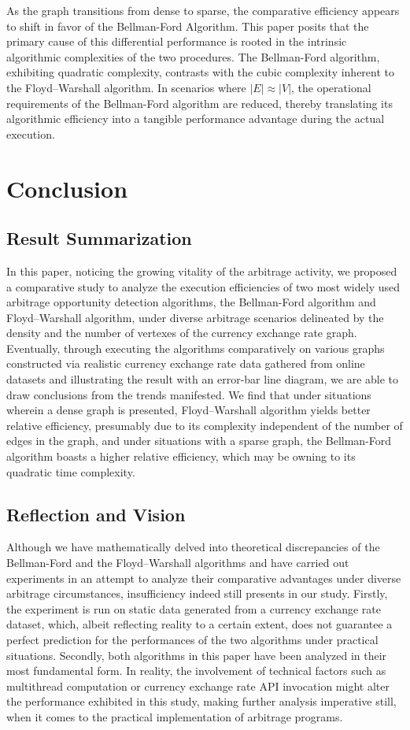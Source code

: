 \documentclass[12pt]{article}
\begin{document}
As the graph transitions from dense to sparse, the comparative efficiency appears to shift in favor of the Bellman-Ford Algorithm. This paper posits that the primary cause of this differential performance is rooted in the intrinsic algorithmic complexities of the two procedures. The Bellman-Ford algorithm, exhibiting quadratic complexity, contrasts with the cubic complexity inherent to the Floyd–Warshall algorithm. In scenarios where $|E| \approx |V|$, the operational requirements of the Bellman-Ford algorithm are reduced, thereby translating its algorithmic efficiency into a tangible performance advantage during the actual execution.

\section{Conclusion}
\subsection{Result Summarization}
In this paper, noticing the growing vitality of the arbitrage activity, we proposed a comparative study to analyze the execution efficiencies of two most widely used arbitrage opportunity detection algorithms, the Bellman-Ford algorithm and Floyd–Warshall algorithm, under diverse arbitrage scenarios delineated by the density and the number of vertexes of the currency exchange rate graph. Eventually, through executing the algorithms comparatively on various graphs constructed via realistic currency exchange rate data gathered from online datasets and illustrating the result with an error-bar line diagram, we are able to draw conclusions from the trends manifested. We find that under situations wherein a dense graph is presented, Floyd–Warshall algorithm yields better relative efficiency, presumably due to its complexity independent of the number of edges in the graph, and under situations with a sparse graph, the Bellman-Ford algorithm boasts a higher relative efficiency, which may be owning to its quadratic time complexity.


\subsection{Reflection and Vision}

Although we have mathematically delved into theoretical discrepancies of the Bellman-Ford and the Floyd–Warshall algorithms and have carried out experiments in an attempt to analyze their comparative advantages under diverse arbitrage circumstances, insufficiency indeed still presents in our study. Firstly, the experiment is run on static data generated from a currency exchange rate dataset, which, albeit reflecting reality to a certain extent, does not guarantee a perfect prediction for the performances of the two algorithms under practical situations. Secondly, both algorithms in this paper have been analyzed in their most fundamental form. In reality, the involvement of technical factors such as multithread computation or currency exchange rate API invocation might alter the performance exhibited in this study, making further analysis imperative still, when it comes to the practical implementation of arbitrage programs. 
\end{document}
